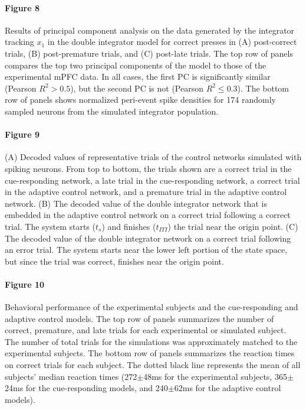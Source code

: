 \documentclass[11pt]{article}
\begin{document}
\paragraph{Figure 8}

Results of principal component analysis
on the data generated by the integrator
tracking $x_1$ in the double integrator model
for correct presses in (A) post-correct trials,
(B) post-premature trials, and (C) post-late trials.
The top row of panels compares
the top two principal components
of the model to those of the experimental mPFC data.
In all cases, the first PC is significantly similar
(Pearson $R^2 > 0.5$),
but the second PC is not (Pearson $R^2 \le 0.3$).
The bottom row of panels shows normalized
peri-event spike densities
for 174 randomly sampled neurons from the
simulated integrator population.

\paragraph{Figure 9}

(A) Decoded values of representative trials of
the control networks simulated with spiking neurons.
From top to bottom, the trials shown are
a correct trial in the cue-responding network,
a late trial in the cue-responding network,
a correct trial in the adaptive control network,
and a premature trial in the adaptive control network.
(B) The decoded value of the double integrator network
that is embedded in the adaptive control network
on a correct trial following a correct trial.
The system starts ($t_s$) and finishes ($t_{ITI}$)
the trial near the origin point.
(C) The decoded value of the double integrator network
on a correct trial following an error trial.
The system starts near the lower left
portion of the state space,
but since the trial was correct,
finishes near the origin point.

\paragraph{Figure 10}

Behavioral performance of the
experimental subjects and
the cue-responding and adaptive control models.
The top row of panels summarizes the number of
correct, premature, and late trials
for each experimental or simulated subject.
The number of total trials
for the simulations was approximately
matched to the experimental subjects.
The bottom row of panels summarizes the reaction times
on correct trials for each subject.
The dotted black line represents
the mean of all subjects' median reaction times
(272$\pm$48ms for the experimental subjects,
365$\pm$24ms for the cue-responding models,
and 240$\pm$62ms for the adaptive control models).
\end{document}
